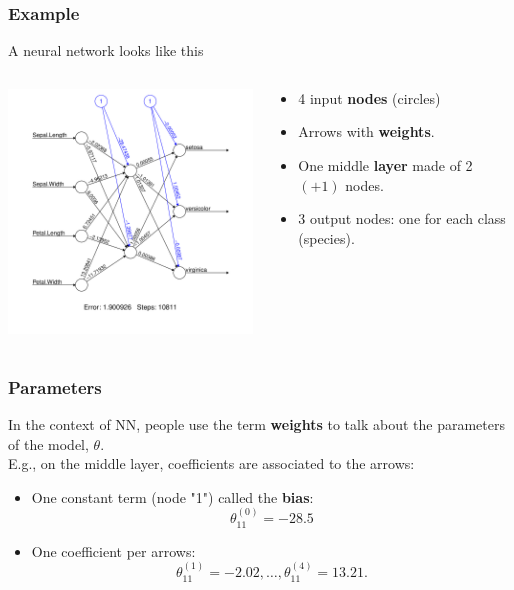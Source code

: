 \begin{frame}
\frametitle{Example}
A neural network looks like this
\begin{columns}
\begin{column}{0.6\linewidth}
\includegraphics[width=8cm]{../../Graphs/NN_Iris.png}
\end{column}
\begin{column}{0.4\linewidth}
\begin{itemize}
\item 4 input {\bf nodes} (circles) 
\item Arrows with {\bf weights}.
\item One middle {\bf layer} made of 2 $(+1)$ nodes.
\item 3 output nodes: one for each class (species).
\end{itemize}
\end{column}
\end{columns}
\end{frame}
\begin{frame}
\frametitle{Parameters}
In the context of NN, people use the term {\bf weights} to talk about the parameters of the model, $\theta$.\\
\vspace{0.3cm}
E.g., on the middle layer, coefficients are associated to the arrows:
\begin{itemize}
\item One constant term (node "1") called the {\bf bias}: 
$$
\theta_{11}^{(0)}=-28.5
$$
\item One coefficient per arrows: 
$$
\theta_{11}^{(1)}=-2.02, \ldots, \theta_{11}^{(4)}=13.21.
$$
\end{itemize}
\end{frame}
